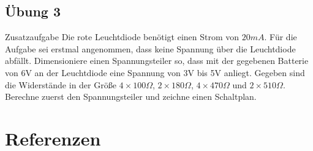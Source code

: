 \subsection*{Übung 3}
\begin{frame}
  \begin{alertblock}{Zusatzaufgabe}
    Die rote Leuchtdiode benötigt einen Strom von $20mA$. Für die Aufgabe sei erstmal angenommen, dass keine Spannung über die Leuchtdiode abfällt. Dimensioniere einen Spannungsteiler so, dass mit der gegebenen Batterie von 6V an der Leuchtdiode eine Spannung von 3V bis 5V anliegt. Gegeben sind die Widerstände in der Größe $4\times100\Omega$, $2\times180\Omega$, $4\times470\Omega$ und $2\times510\Omega$. Berechne zuerst den Spannungsteiler und zeichne einen Schaltplan.
  \end{alertblock}
\end{frame}


\section*{Referenzen}

